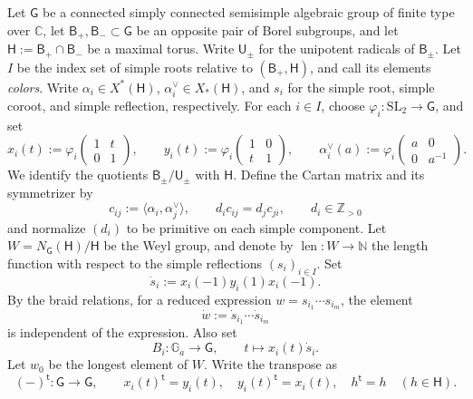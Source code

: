 \documentclass[10pt,a4paper]{article}
\theoremstyle{definition}
\theoremstyle{remark}
\newcommand{\C}{\mathbb C}
\newcommand{\groupG}{\mathsf{G}}
\newcommand{\borelB}{\mathsf{B}}
\newcommand{\unipotentU}{\mathsf{U}}
\newcommand{\torusH}{\mathsf{H}}
\newcommand{\len}{\operatorname{len}}
\begin{document}
Let \(\groupG\) be a connected simply connected semisimple algebraic group of
finite type over \(\C\), 
let \(\borelB_+,\borelB_-\subset\groupG\) be an opposite pair of Borel subgroups,
and let \(\torusH:=\borelB_+ \cap \borelB_-\) be a maximal torus.  Write 
\(\unipotentU_\pm\) for the unipotent radicals of \(\borelB_\pm\).  
Let \(I\)
be the index set of simple roots relative to \((\borelB_+,\torusH)\), and call
its elements \emph{colors}.  Write \(\alpha_i\in X^*(\torusH)\),
\(\alpha_i^\vee\in X_*(\torusH)\), and \(s_i\) for the simple root, simple
coroot, and simple reflection, respectively.  For each \(i\in I\), choose
\(\varphi_i:\mathrm{SL}_2\to\groupG\), and set
\[
 x_i(t):=\varphi_i\!\begin{pmatrix}1&t\\0&1\end{pmatrix},\qquad
 y_i(t):=\varphi_i\!\begin{pmatrix}1&0\\t&1\end{pmatrix},\qquad
 \alpha_i^\vee(a):=\varphi_i\!\begin{pmatrix}a&0\\0&a^{-1}\end{pmatrix}.
\]
We identify the quotients \(\borelB_\pm/\unipotentU_\pm\) with \(\torusH\).
Define the Cartan matrix and its symmetrizer by
\[
 c_{ij}:=\langle\alpha_i,\alpha_j^\vee\rangle,\qquad
 d_ic_{ij}=d_jc_{ji},\qquad d_i\in\mathbb Z_{>0}
\]
and normalize \((d_i)\) to be primitive on each simple component.  Let
\(W=N_\groupG(\torusH)/\torusH\) be the Weyl group, and denote by
\(\len:W\to\mathbb N\) the length function with respect to the simple
reflections \((s_i)_{i\in I}\).  Set
\[
 \dot s_i:=x_i(-1)y_i(1)x_i(-1).
\]
By the braid relations, for a reduced expression
\(w=s_{i_1}\cdots s_{i_m}\), the element
\[
 \dot w:=\dot s_{i_1}\cdots\dot s_{i_m}
\]
is independent of the expression.  Also set
\[
 B_i:\mathbb G_a\longrightarrow\groupG,
 \qquad t\longmapsto x_i(t)\dot s_i.
\]
Let \(w_0\) be the longest element of \(W\).  Write the transpose as
\[
 (-)^{\mathsf t}:\groupG\longrightarrow\groupG,
 \qquad
 x_i(t)^{\mathsf t}=y_i(t),\quad
 y_i(t)^{\mathsf t}=x_i(t),\quad
 h^{\mathsf t}=h\quad(h\in\torusH).
\]
\end{document}
